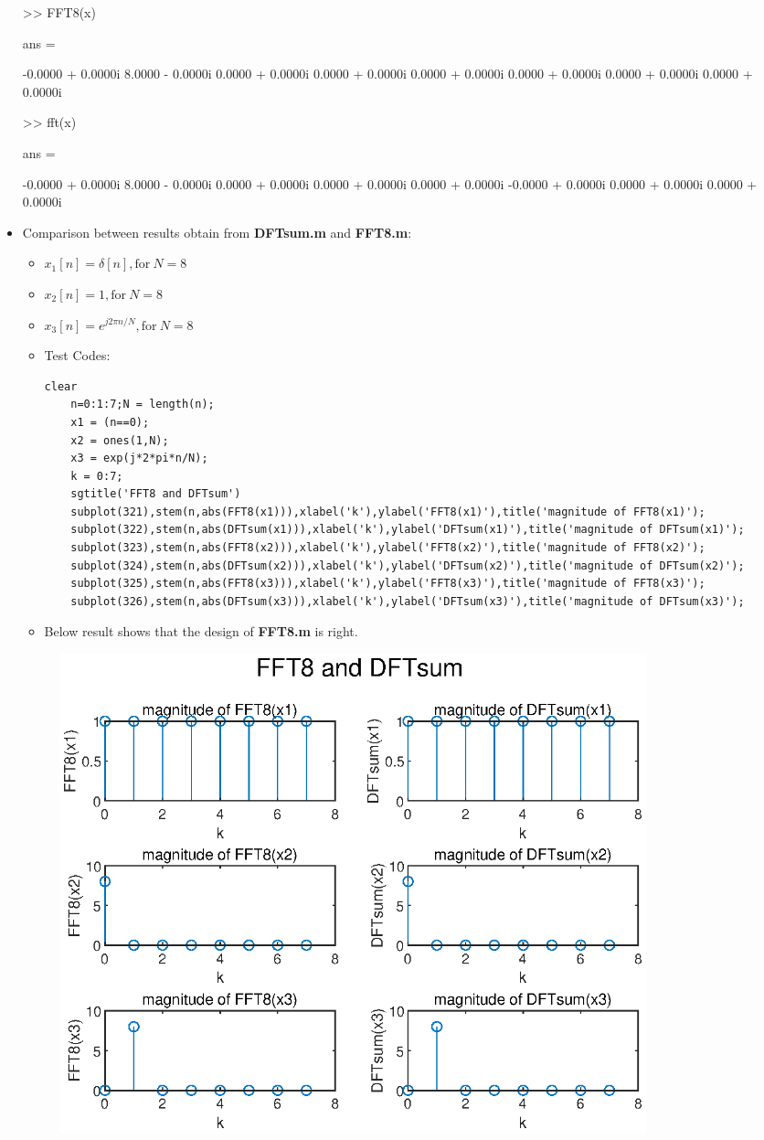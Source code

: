 \documentclass[onecolumn,oneside]{SUSTechHomework}
\begin{document}
\begin{itemize}
\begin{center}
{{				>> FFT8(x)
				
				ans =
				
				  -0.0000 + 0.0000i   8.0000 - 0.0000i   0.0000 + 0.0000i   0.0000 + 0.0000i   0.0000 + 0.0000i   0.0000 + 0.0000i   0.0000 + 0.0000i   0.0000 + 0.0000i
				
				>> fft(x)
				
				ans =
				
				  -0.0000 + 0.0000i   8.0000 - 0.0000i   0.0000 + 0.0000i   0.0000 + 0.0000i   0.0000 + 0.0000i  -0.0000 + 0.0000i   0.0000 + 0.0000i   0.0000 + 0.0000i
			}
		}
	\end{center}
	\item Comparison between results obtain from \textbf{DFTsum.m} and \textbf{FFT8.m}:
	\begin{itemize}
		\item $x_1[n]=\delta[n], \text{for}\ N=8$
		\item $x_2[n]=1, \text{for}\ N=8$
		\item $x_3[n]=e^{j2\pi n/N}, \text{for}\ N=8$
		\item Test Codes:
\begin{lstlisting}[title=\textbf{q5\_3\_2a.m}]
	clear
	n=0:1:7;N = length(n);
	x1 = (n==0);
	x2 = ones(1,N);
	x3 = exp(j*2*pi*n/N);
	k = 0:7;
	sgtitle('FFT8 and DFTsum')
	subplot(321),stem(n,abs(FFT8(x1))),xlabel('k'),ylabel('FFT8(x1)'),title('magnitude of FFT8(x1)');
	subplot(322),stem(n,abs(DFTsum(x1))),xlabel('k'),ylabel('DFTsum(x1)'),title('magnitude of DFTsum(x1)');
	subplot(323),stem(n,abs(FFT8(x2))),xlabel('k'),ylabel('FFT8(x2)'),title('magnitude of FFT8(x2)');
	subplot(324),stem(n,abs(DFTsum(x2))),xlabel('k'),ylabel('DFTsum(x2)'),title('magnitude of DFTsum(x2)');
	subplot(325),stem(n,abs(FFT8(x3))),xlabel('k'),ylabel('FFT8(x3)'),title('magnitude of FFT8(x3)');
	subplot(326),stem(n,abs(DFTsum(x3))),xlabel('k'),ylabel('DFTsum(x3)'),title('magnitude of DFTsum(x3)');
\end{lstlisting}
		\item Below result shows that the design of \textbf{FFT8.m} is right.
	\end{itemize}
	\begin{figure}[H]
		\centering
		\includegraphics[width=170mm]{pictures/q5_3_2a.eps}

\end{figure}
\end{itemize}
\end{document}
